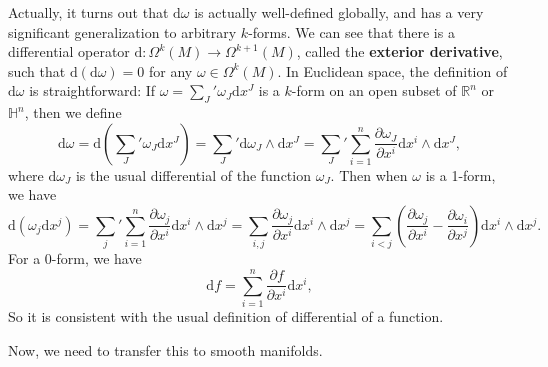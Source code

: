 \documentclass[../main.tex]{subfiles}
\begin{document}
Actually, it turns out that $\mathrm{d} \omega$ is actually well-defined globally, and has a very significant generalization to arbitrary $k$-forms. We can see that there is a differential operator $\mathrm{d} : \Omega^k(M) \to \Omega^{k+1}(M)$, called the \textbf{exterior derivative}, such that $\mathrm{d} (\mathrm{d} \omega) = 0$ for any $\omega \in \Omega^k(M)$. In Euclidean space, the definition of $\mathrm{d} \omega$ is straightforward: If $\omega = \sum_{J}^{}' \omega_J \mathrm{d} x^J$ is a $k$-form on an open subset of $\mathbb{R}^n$ or $\mathbb{H}^n$, then we define
\begin{equation*}
  \mathrm{d} \omega = \mathrm{d} \left(\sum_{J}^{}' \omega_J \mathrm{d} x^J\right) = \sum_{J}^{}' \mathrm{d} \omega_J \wedge \mathrm{d} x^J = \sum_{J}^{}' \sum_{i=1}^n \frac{\partial \omega_J}{\partial x^i} \mathrm{d} x^i \wedge \mathrm{d} x^J,
\end{equation*}
where $\mathrm{d} \omega_J$ is the usual differential of the function $\omega_J$. Then when $\omega$ is a 1-form, we have
\begin{equation*}
    \mathrm{d} (\omega_j \mathrm{d} x^j) = \sum_{j}^{}' \sum_{i=1}^n \frac{\partial \omega_j}{\partial x^i} \mathrm{d} x^i \wedge \mathrm{d} x^j = \sum_{i,j} \frac{\partial \omega_j}{\partial x^i} \mathrm{d} x^i \wedge \mathrm{d} x^j  = \sum_{i<j} \left(\frac{\partial \omega_j}{\partial x^i} - \frac{\partial \omega_i}{\partial x^j}\right) \mathrm{d} x^i \wedge \mathrm{d} x^j.
\end{equation*}
For a 0-form, we have
\begin{equation*}
  \mathrm{d} f = \sum_{i=1}^n \frac{\partial f}{\partial x^i} \mathrm{d} x^i,
\end{equation*}
So it is consistent with the usual definition of differential of a function.

Now, we need to transfer this to smooth manifolds.
\end{document}
